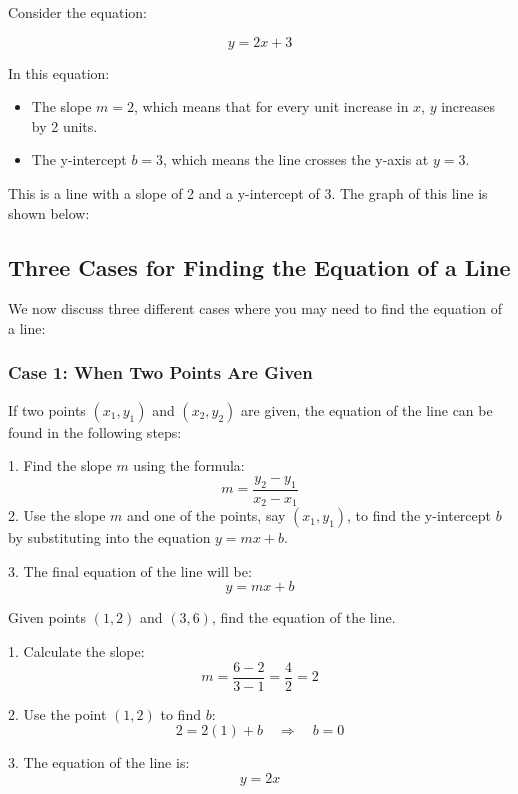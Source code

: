 \begin{example}

Consider the equation:

\[
y = 2x + 3
\]

In this equation:
\begin{itemize}
    \item The slope \( m = 2 \), which means that for every unit increase in \( x \), \( y \) increases by 2 units.
    \item The y-intercept \( b = 3 \), which means the line crosses the y-axis at \( y = 3 \).
\end{itemize}

This is a line with a slope of 2 and a y-intercept of 3. The graph of this line is shown below:

\begin{center}
\end{center}
\end{example}

\subsection{Three Cases for Finding the Equation of a Line}

We now discuss three different cases where you may need to find the equation of a line:

\subsubsection{Case 1: When Two Points Are Given}
If two points \((x_1, y_1)\) and \((x_2, y_2)\) are given, the equation of the line can be found in the following steps:

1. Find the slope \( m \) using the formula:
   \[
   m = \frac{y_2 - y_1}{x_2 - x_1}
   \]
2. Use the slope \( m \) and one of the points, say \((x_1, y_1)\), to find the y-intercept \( b \) by substituting into the equation \( y = mx + b \).

3. The final equation of the line will be:
   \[
   y = mx + b
   \]

\begin{example}
 Given points \((1, 2)\) and \((3, 6)\), find the equation of the line.

1. Calculate the slope:
   \[
   m = \frac{6 - 2}{3 - 1} = \frac{4}{2} = 2
   \]

2. Use the point \((1, 2)\) to find \( b \):
   \[
   2 = 2(1) + b \quad \Rightarrow \quad b = 0
   \]

3. The equation of the line is:
   \[
   y = 2x
   \]

\end{example}
